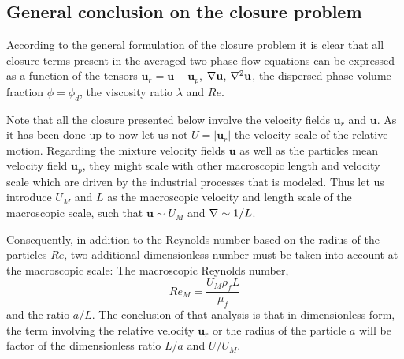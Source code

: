 
\subsection{General conclusion on the closure problem}

According to the general formulation of the closure problem it is clear that all closure terms present in the averaged two phase flow equations can be expressed as a function of the tensors $\textbf{u}_{r} =\textbf{u}- \textbf{u}_p$, $\mathbf{\nabla} \textbf{u}$, $\mathbf{\nabla}^2 \textbf{u}$, the dispersed phase volume fraction $\phi =\phi_d$, the viscosity ratio $\lambda$ and  $Re$. 

Note that all the closure presented below involve the velocity fields $\textbf{u}_r$ and $\textbf{u}$. 
As it has been done up to now let us not $U = |\textbf{u}_r|$ the velocity scale of the relative motion. 
Regarding the mixture velocity fields $\textbf{u}$ as well as the particles mean velocity field $\textbf{u}_p$, they might scale with other macroscopic length and velocity scale which are driven by the industrial processes that is modeled\citet{jackson1997locally}. 
Thus let us introduce $U_M$ and $L$ as the macroscopic velocity and length scale of the macroscopic scale, such that $\textbf{u}\sim U_M$ and $\mathbf{\nabla} \sim 1/L$. 

Consequently, in addition to the Reynolds number based on the radius of the particles $Re$, two additional dimensionless number must be taken into account at the macroscopic scale: The macroscopic Reynolds number,
\begin{equation*}
    Re_M = \frac{U_M \rho_f L}{\mu_f}
\end{equation*}
and the ratio $a/L$.
The conclusion of that analysis is that in dimensionless form, the term involving the relative velocity $\textbf{u}_r$ or the radius of the particle $a$ will be factor of the dimensionless ratio $L/a$ and $U/U_M$. 


